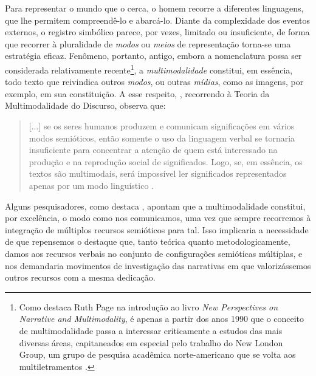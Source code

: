 \documentclass[portuguese]{textolivre}
\begin{document}
Para representar o mundo que o cerca, o homem recorre a diferentes linguagens,
que lhe permitem compreendê-lo e abarcá-lo. Diante da complexidade dos eventos
externos, o registro simbólico parece, por vezes, limitado ou insuficiente, de
forma que recorrer à pluralidade de \textit{modos} ou \textit{meios} de
representação torna-se uma estratégia eficaz. Fenômeno, portanto, antigo,
embora a nomenclatura possa ser considerada relativamente recente\footnote{
    Como destaca Ruth Page na introdução ao livro \textit{New Perspectives on Narrative
    and Multimodality}, é apenas a partir dos anos 1990 que o conceito de
    multimodalidade passa a interessar criticamente a estudos das mais diversas
    áreas, capitaneados em especial pelo trabalho do New London Group, um grupo de
    pesquisa acadêmica norte-americano que se volta aos multiletramentos
    \cite[p.~3-5]{page_new_2010}.},
a \textit{multimodalidade} constitui, em
essência, todo texto que reivindica outros \textit{modos}, ou outras
\textit{mídias}, como as imagens, por exemplo, em sua constituição. A esse
respeito, \textcite{vieira_multimodalidade_2015}, recorrendo à Teoria da
Multimodalidade do Discurso, observa que:
\begin{quote}
    [...] se os seres humanos produzem e comunicam significações em vários
    modos semióticos, então somente o uso da linguagem verbal se tornaria
    insuficiente para concentrar a atenção de quem está interessado na produção
    e na reprodução social de significados. Logo, se, em essência, os textos
    são multimodais, será impossível ler significados representados apenas por
    um modo linguístico \cite[p.~44]{vieira_multimodalidade_2015}.
\end{quote}

Alguns pesquisadores, como destaca \textcite{page_new_2010}, apontam que a
multimodalidade constitui, por excelência, o modo como nos comunicamos, uma vez
que sempre recorremos à integração de múltiplos recursos semióticos para tal.
Isso implicaria a necessidade de que repensemos o destaque que, tanto teórica
quanto metodologicamente, damos aos recursos verbais no conjunto de
configurações semióticas múltiplas, e nos demandaria movimentos de investigação
das narrativas em que valorizássemos outros recursos com a mesma dedicação.
\end{document}
